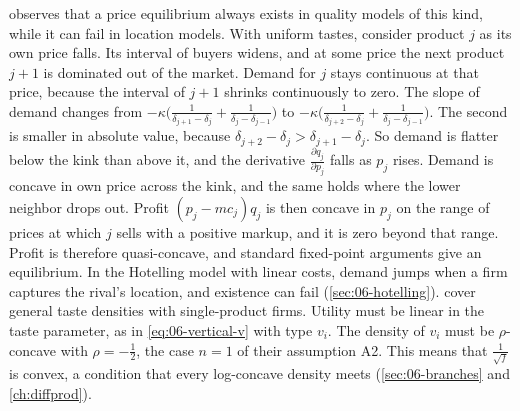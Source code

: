\begin{remark}\label{rem:06-vexist}
\citet[footnote~6]{Bresnahan1987} observes that a price equilibrium always exists in quality models of
this kind, while it can fail in location models. With uniform tastes, consider product $j$ as its own price
falls. Its interval of buyers widens, and at some price the next product $j + 1$ is dominated out of the
market. Demand for $j$ stays continuous at that price, because the interval of $j + 1$ shrinks continuously
to zero. The slope of demand changes from $-\kappa\big(\frac{1}{\delta_{j+1} - \delta_j} + \frac{1}{\delta_j - \delta_{j-1}}\big)$
to $-\kappa\big(\frac{1}{\delta_{j+2} - \delta_j} + \frac{1}{\delta_j - \delta_{j-1}}\big)$. The second is smaller in
absolute value, because $\delta_{j+2} - \delta_j > \delta_{j+1} - \delta_j$. So demand is flatter below the kink
than above it, and the derivative $\frac{\partial q_j}{\partial p_j}$ falls as $p_j$ rises. Demand is concave in own
price across the kink, and the same holds where the lower neighbor drops out. Profit $(p_j - mc_j)q_j$ is
then concave in $p_j$ on the range of prices at which $j$ sells with a positive markup, and it is zero beyond
that range. Profit is therefore quasi-concave, and standard fixed-point arguments give an equilibrium. In the Hotelling model with linear costs, demand jumps when a firm captures the rival's
location, and existence can fail (\cref{sec:06-hotelling}). \citet[Theorem~2]{CaplinNalebuff1991} cover general taste
densities with single-product firms. Utility must be linear in the taste parameter, as in \eqref{eq:06-vertical-v}
with type $v_i$. The density of $v_i$ must be $\rho$-concave with $\rho = -\frac{1}{2}$, the case $n = 1$ of their
assumption A2. This means that $\frac{1}{\sqrt{f}}$ is convex, a condition that every log-concave density meets
(\cref{sec:06-branches} and \cref{ch:diffprod}).
\end{remark}

